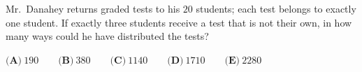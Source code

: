 Mr.\ Danahey returns graded tests to his $20$ students; each test belongs to exactly one student. If exactly three students receive a test that is not their own, in how many ways could he have distributed the tests?

$\textbf{(A)}\ 190\qquad\textbf{(B)}\ 380\qquad\textbf{(C)}\ 1140\qquad\textbf{(D)}\ 1710\qquad\textbf{(E)}\ 2280$

